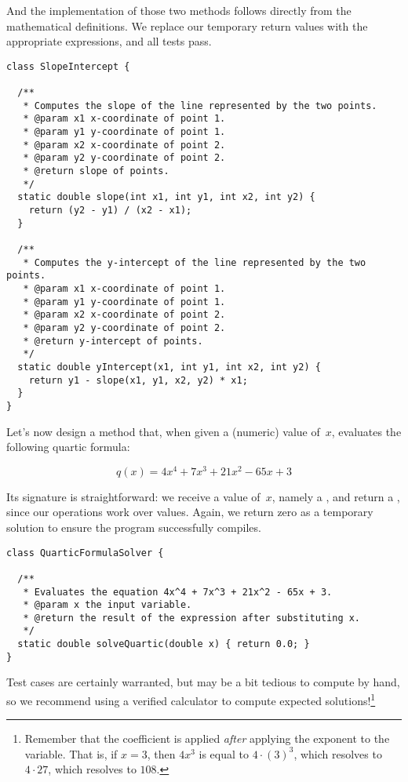 And the implementation of those two methods follows directly from the mathematical definitions. 
We replace our temporary  return values with the appropriate expressions, and all tests pass.

\begin{lstlisting}[language=MyJava]
class SlopeIntercept {

  /**
   * Computes the slope of the line represented by the two points.
   * @param x1 x-coordinate of point 1.
   * @param y1 y-coordinate of point 1.
   * @param x2 x-coordinate of point 2.
   * @param y2 y-coordinate of point 2.
   * @return slope of points.
   */
  static double slope(int x1, int y1, int x2, int y2) {
    return (y2 - y1) / (x2 - x1);
  }

  /**
   * Computes the y-intercept of the line represented by the two points.
   * @param x1 x-coordinate of point 1.
   * @param y1 y-coordinate of point 1.
   * @param x2 x-coordinate of point 2.
   * @param y2 y-coordinate of point 2.
   * @return y-intercept of points.
   */
  static double yIntercept(x1, int y1, int x2, int y2) {
    return y1 - slope(x1, y1, x2, y2) * x1;
  }
}
\end{lstlisting}

Let's now design a method that, when given a (numeric) value of~$x$, evaluates the following quartic formula:

\[
q(x) = 4x^4 + 7x^3 + 21x^2 - 65x + 3
\]

Its signature is straightforward: we receive a value of~$x$, namely a , and return a , since our operations work over  values. 
Again, we return zero as a temporary solution to ensure the program successfully compiles.

\begin{lstlisting}[language=MyJava]
class QuarticFormulaSolver {

  /**
   * Evaluates the equation 4x^4 + 7x^3 + 21x^2 - 65x + 3.
   * @param x the input variable.
   * @return the result of the expression after substituting x.
   */
  static double solveQuartic(double x) { return 0.0; }
}
\end{lstlisting}

Test cases are certainly warranted, but may be a bit tedious to compute by hand, so we recommend using a verified calculator to compute expected solutions!\footnote{Remember that the coefficient is applied \emph{after} applying the exponent to the variable. That is, if $x=3$, then $4x^3$ is equal to $4 \cdot (3)^3$, which resolves to $4 \cdot 27$, which resolves to $108$.}

